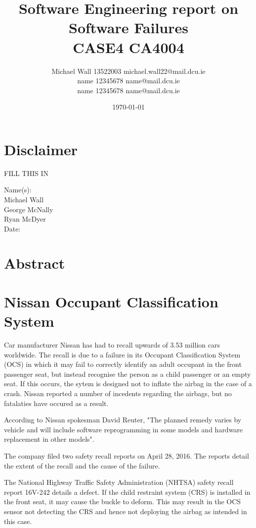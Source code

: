 \documentclass[a4paper,12pt]{article}
\title{Software Engineering report on Software Failures\\CASE4 CA4004}
\author{Michael Wall 13522003 michael.wall22@mail.dcu.ie\\name 12345678 name@mail.dcu.ie\\name 12345678 name@mail.dcu.ie}
\date{\today}
\begin{document}
\maketitle
\newpage

\tableofcontents

\newpage

\section{Disclaimer}
FILL THIS IN

Name(s): \\Michael Wall\\George McNally\\Ryan McDyer\\

Date:

\newpage

\section{Abstract}

\section{Nissan Occupant Classification System}
Car manufacturer Nissan has had to recall upwards of 3.53 million cars worldwide. The recall is due to a failure in its Occupant Classification System (OCS) in which it may fail to correctly identify an adult occupant in the front passenger seat, but instead recognise the person as a child passenger or an empty seat. If this occurs, the sytem is designed not to inflate the airbag in the case of a crash. Nissan reported a number of incedents regarding the airbags, but no fatalaties have occured as a result.

According to Nissan spokesman David Reuter, "The planned remedy varies by vehicle and will include software reprogramming in some models and hardware replacement in other models".

The company filed two safety recall reports on April 28, 2016. The reports detail the extent of the recall and the cause of the failure.

The National Highway Traffic Safety Administration (NHTSA) safety recall report 16V-242 details a defect. If the child restraint system (CRS) is installed in the front seat, it may cause the buckle to deform. This may result in the OCS sensor not detecting the CRS and hence not deploying the airbag as intended in this case.
\end{document}
